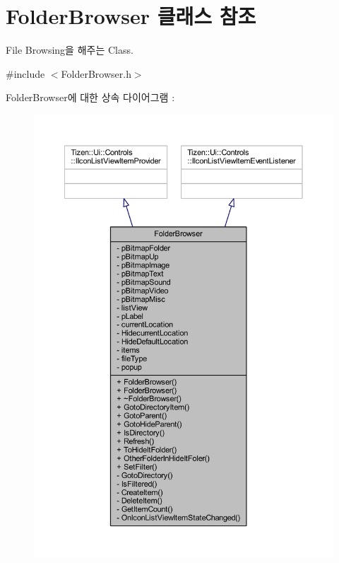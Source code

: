 \hypertarget{class_folder_browser}{\section{Folder\+Browser 클래스 참조}
\label{class_folder_browser}
}


File Browsing을 해주는 Class.  




{\ttfamily \#include $<$Folder\+Browser.\+h$>$}



Folder\+Browser에 대한 상속 다이어그램 \+: 
\nopagebreak
\begin{figure}[H]
\begin{center}
\leavevmode
\includegraphics[width=350pt]{class_folder_browser__inherit__graph}
\end{center}
\end{figure}


